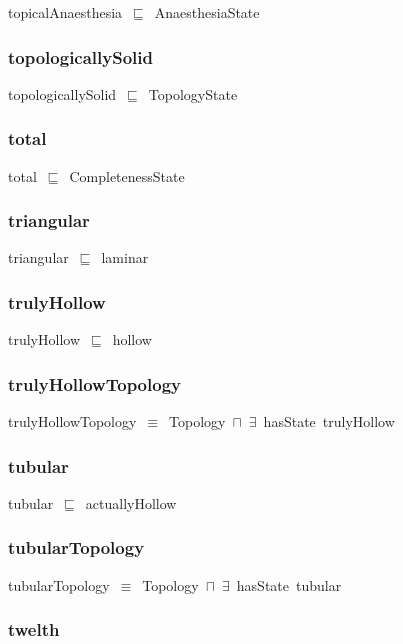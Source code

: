 \documentclass{article}
\begin{document}
topicalAnaesthesia~\ensuremath{\sqsubseteq}~AnaesthesiaState~

\subsubsection*{topologicallySolid}

topologicallySolid~\ensuremath{\sqsubseteq}~TopologyState~

\subsubsection*{total}

total~\ensuremath{\sqsubseteq}~CompletenessState~

\subsubsection*{triangular}

triangular~\ensuremath{\sqsubseteq}~laminar~

\subsubsection*{trulyHollow}

trulyHollow~\ensuremath{\sqsubseteq}~hollow~

\subsubsection*{trulyHollowTopology}

trulyHollowTopology~\ensuremath{\equiv}~Topology~\ensuremath{\sqcap}~\ensuremath{\exists}~hasState~trulyHollow

\subsubsection*{tubular}

tubular~\ensuremath{\sqsubseteq}~actuallyHollow~

\subsubsection*{tubularTopology}

tubularTopology~\ensuremath{\equiv}~Topology~\ensuremath{\sqcap}~\ensuremath{\exists}~hasState~tubular

\subsubsection*{twelth}
\end{document}

